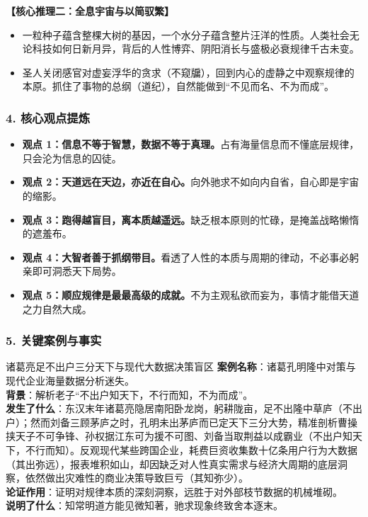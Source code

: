 \noindent\textbf{【核心推理二：全息宇宙与以简驭繁】}
\begin{itemize}
    \item 一粒种子蕴含整棵大树的基因，一个水分子蕴含整片汪洋的性质。人类社会无论科技如何日新月异，背后的人性博弈、阴阳消长与盛极必衰规律千古未变。
    \item 圣人关闭感官对虚妄浮华的贪求（不窥牖），回到内心的虚静之中观察规律的本原。抓住了事物的总纲（道纪），自然能做到“不见而名、不为而成”。
\end{itemize}

\subsubsection{4. 核心观点提炼}
\begin{itemize}
    \item \textbf{观点 1：信息不等于智慧，数据不等于真理。}占有海量信息而不懂底层规律，只会沦为信息的囚徒。
    \item \textbf{观点 2：天道远在天边，亦近在自心。}向外驰求不如向内自省，自心即是宇宙的缩影。
    \item \textbf{观点 3：跑得越盲目，离本质越遥远。}缺乏根本原则的忙碌，是掩盖战略懒惰的遮羞布。
    \item \textbf{观点 4：大智者善于抓纲带目。}看透了人性的本质与周期的律动，不必事必躬亲即可洞悉天下局势。
    \item \textbf{观点 5：顺应规律是最最高级的成就。}不为主观私欲而妄为，事情才能借天道之力自然大成。
\end{itemize}

\subsubsection{5. 关键案例与事实}
\begin{CaseBox}{诸葛亮足不出户三分天下与现代大数据决策盲区}
\textbf{案例名称}：诸葛孔明隆中对策与现代企业海量数据分析迷失。\\
\textbf{背景}：解析老子“不出户知天下，不行而知，不为而成”。\\
\textbf{发生了什么}：东汉末年诸葛亮隐居南阳卧龙岗，躬耕陇亩，足不出隆中草庐（不出户）；然而刘备三顾茅庐之时，孔明未出茅庐而已定天下三分大势，精准剖析曹操挟天子不可争锋、孙权据江东可为援不可图、刘备当取荆益以成霸业（不出户知天下，不行而知）。反观现代某些跨国企业，耗费巨资收集数十亿条用户行为大数据（其出弥远），报表堆积如山，却因缺乏对人性真实需求与经济大周期的底层洞察，依然做出灾难性的商业决策导致巨亏（其知弥少）。\\
\textbf{论证作用}：证明对规律本质的深刻洞察，远胜于对外部枝节数据的机械堆砌。\\
\textbf{说明了什么}：知常明道方能见微知著，驰求现象终致舍本逐末。
\end{CaseBox}

